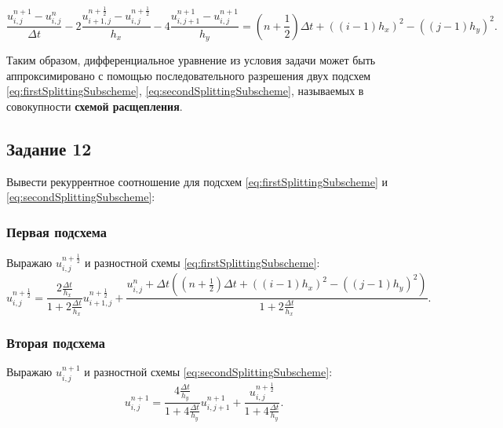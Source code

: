 \documentclass[12pt, a4paper]{report}
\begin{document}
	\begin{equation}\label{eq:splittingScheme}
		\frac{u_{i, j}^{n+1} - u_{i, j}^{n}}{\Delta t} - 2\frac{u_{i+1, j}^{n+\frac{1}{2}} - u_{i, j}^{n+\frac{1}{2}}}{h_{x}} - 4\frac{u_{i, j+1}^{n+1} - u_{i, j}^{n+1}}{h_{y}} = (n + \frac{1}{2})\Delta t + ((i-1)h_{x})^{2} - ((j-1)h_{y})^{2}.
	\end{equation}
	\par
	\large
	Таким образом, дифференциальное уравнение из условия задачи может быть аппроксимировано с помощью последовательного разрешения двух подсхем \eqref{eq:firstSplittingSubscheme}, \eqref{eq:secondSplittingSubscheme}, называемых в совокупности \textbf{схемой расщепления}.

	\subsection*{Задание 12}
	\large
	Вывести рекуррентное соотношение для подсхем \eqref{eq:firstSplittingSubscheme} и \eqref{eq:secondSplittingSubscheme}: \par
	\subsubsection*{Первая подсхема}
	\large
	Выражаю $u_{i, j}^{n+\frac{1}{2}}$ и разностной схемы \eqref{eq:firstSplittingSubscheme}:
	\begin{equation*}
		u_{i, j}^{n+\frac{1}{2}} = \frac{2\frac{\Delta t}{h_{x}}}{1 + 2\frac{\Delta t}{h_{x}}}u_{i+1, j}^{n+\frac{1}{2}} + \frac{u_{i, j}^{n} + \Delta t((n + \frac{1}{2})\Delta t + ((i-1)h_{x})^{2} - ((j-1)h_{y})^{2})}{1 + 2\frac{\Delta t}{h_{x}}}.
	\end{equation*}
	\subsubsection*{Вторая подсхема}
	\large
	Выражаю $u_{i, j}^{n+1}$ и разностной схемы \eqref{eq:secondSplittingSubscheme}:
	\begin{equation*}
		u_{i, j}^{n+1} = \frac{4\frac{\Delta t}{h_{y}}}{1 + 4\frac{\Delta t}{h_{y}}}u_{i, j+1}^{n+1} + \frac{u_{i, j}^{n+\frac{1}{2}}}{1 + 4\frac{\Delta t}{h_{y}}}.
	\end{equation*}
\end{document}
